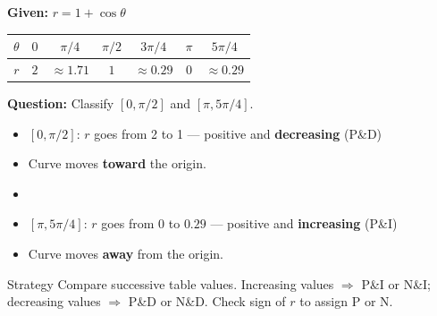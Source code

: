 \documentclass[aspectratio=169, 11pt]{beamer}
\begin{document}
\begin{frame}[t, plain]

  \textbf{Given:} $r = 1 + \cos\theta$

  \vspace{0.2cm}
  \renewcommand{\arraystretch}{1.3}
  \begin{tabular}{|c|c|c|c|c|c|c|}
    \hline
    $\theta$ & $0$ & $\pi/4$ & $\pi/2$ & $3\pi/4$ & $\pi$ & $5\pi/4$ \\
    \hline
    $r$ & $2$ & $\approx 1.71$ & $1$ & $\approx 0.29$ & $0$ & $\approx 0.29$ \\
    \hline
  \end{tabular}

  \vspace{0.4cm}
  \textbf{Question:} Classify $[0, \pi/2]$ and $[\pi, 5\pi/4]$.

  \vspace{0.2cm}
  \begin{itemize}
    \item $[0, \pi/2]$: $r$ goes from 2 to 1 --- positive and \textbf{decreasing} (P\&D)
    \item[$\Rightarrow$] Curve moves \textbf{toward} the origin.
    \item[$\,$]
    \item $[\pi, 5\pi/4]$: $r$ goes from 0 to $0.29$ --- positive and \textbf{increasing} (P\&I)
    \item[$\Rightarrow$] Curve moves \textbf{away} from the origin.
  \end{itemize}

  \vspace{0.2cm}
  \begin{block}{Strategy}
    Compare successive table values. Increasing values $\Rightarrow$ P\&I or N\&I;
    decreasing values $\Rightarrow$ P\&D or N\&D. Check sign of $r$ to assign P or N.
  \end{block}
\end{frame}
\end{document}
